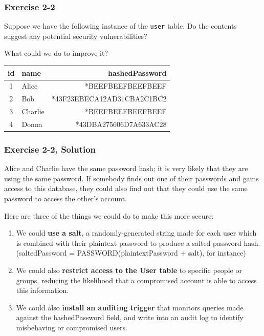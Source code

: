 \begin{frame}
\frametitle{Exercise 2-2}

Suppose we have the following instance of the \texttt{user} table. Do the contents suggest any potential security vulnerabilities?

What could we do to improve it?

\begin{center}
  \begin{tabular}{||c l r||}
  \hline
  id & name & hashedPassword \\ [0.5ex]
  \hline\hline
  1 & Alice & *BEEFBEEFBEEFBEEF \\
  \hline
  2 & Bob & *43F23EBECA12AD31CBA2C1BC2 \\
  \hline
  3 & Charlie & *BEEFBEEFBEEFBEEF \\
  \hline
  4 & Donna & *43DBA275606D7A633AC28 \\
  \hline
\end{tabular}
\end{center}

\end{frame}


\begin{frame}
\frametitle{Exercise 2-2, Solution}

Alice and Charlie have the same password hash; it is very likely that they are using the same password. If somebody finds out one of their passwords and gains access to this database, they could also find out that they could use the same password to access the other's account.

Here are three of the things we could do to make this more secure:

\begin{enumerate}
  \item We could \textbf{use a salt}, a randomly-generated string made for each user which is combined with their plaintext password to produce a salted password hash.
(saltedPassword = PASSWORD(plaintextPassword + salt), for instance)

  \item We could also \textbf{restrict access to the User table} to specific people or groups, reducing the likelihood that a compromised account is able to access this information.

  \item We could also \textbf{install an auditing trigger} that monitors queries made against the hashedPassword field, and write into an audit log to identify misbehaving or compromised users.
\end{enumerate}
\end{frame}


